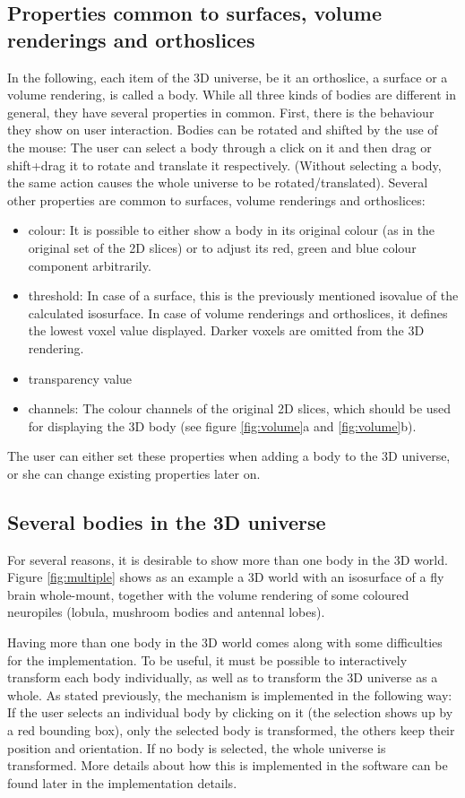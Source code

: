 \documentclass[a4paper,10pt]{article}
\begin{document}
\subsection{Properties common to surfaces, volume renderings and orthoslices}
In the following, each item of the 3D universe, be it an orthoslice, a surface or a volume rendering, is called a body.
While all three kinds of bodies are different in general, they have several properties in common.
First, there is the behaviour they show on user interaction. Bodies can be rotated and shifted by the use of the mouse: The user can select a body through a click on it and then drag or shift+drag it to rotate and translate it respectively. (Without selecting a body, the same action causes the whole universe to be rotated/translated).
Several other properties are common to surfaces, volume renderings and orthoslices:
\begin{itemize}
\item colour: It is possible to either show a body in its original colour (as in the original set of the 2D slices) or to adjust its red, green and blue colour component arbitrarily.
\item threshold: In case of a surface, this is the previously mentioned isovalue of the calculated isosurface. In case of volume renderings and orthoslices, it defines the lowest voxel value displayed. Darker voxels are omitted from the 3D rendering.
\item transparency value
\item channels: The colour channels of the original 2D slices, which should be used for displaying the 3D body (see figure \ref{fig:volume}a and \ref{fig:volume}b).
\end{itemize}

The user can either set these properties when adding a body to the 3D universe, or she can change existing properties later on.

\subsection{Several bodies in the 3D universe}
For several reasons, it is desirable to show more than one body in the 3D world.
Figure \ref{fig:multiple} shows as an example a 3D world with an isosurface of a fly brain whole-mount, together with the volume rendering of some coloured neuropiles (lobula, mushroom bodies and antennal lobes).

Having more than one body in the 3D world comes along with some difficulties for the implementation. To be useful, it must be possible to interactively transform each body individually, as well as to transform the 3D universe as a whole. As stated previously, the mechanism is implemented in the following way: If the user selects an individual body by clicking on it (the selection shows up by a red bounding box), only the selected body is transformed, the others keep their position and orientation. If no body is selected, the whole universe is transformed.
More details about how this is implemented in the software can be found later in the implementation details.
\end{document}
